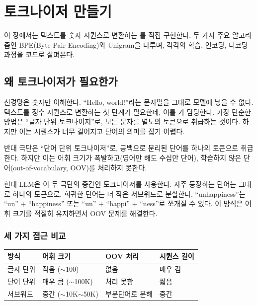 \chapter{토크나이저 만들기}
\label{ch:tokenizer}

이 장에서는 텍스트를 숫자 시퀀스로 변환하는 를 직접 구현한다. 두 가지 주요 알고리즘인 BPE(Byte Pair Encoding)와 Unigram을 다루며, 각각의 학습, 인코딩, 디코딩 과정을 코드로 살펴본다.

\section{왜 토크나이저가 필요한가}

신경망은 숫자만 이해한다. ``Hello, world!''라는 문자열을 그대로 모델에 넣을 수 없다. 텍스트를 정수 시퀀스로 변환하는 첫 단계가 필요한데, 이를 가 담당한다. 가장 단순한 방법은 ``글자 단위 토크나이저''로, 모든 문자를 별도의 토큰으로 취급하는 것이다. 하지만 이는 시퀀스가 너무 길어지고 단어의 의미를 잡기 어렵다.

반대 극단은 ``단어 단위 토크나이저''로, 공백으로 분리된 단어를 하나의 토큰으로 취급한다. 하지만 이는 어휘 크기가 폭발하고(영어만 해도 수십만 단어), 학습하지 않은 단어(out-of-vocabulary, OOV)를 처리하지 못한다.

현대 LLM은 이 두 극단의 중간인  토크나이저를 사용한다. 자주 등장하는 단어는 그대로 하나의 토큰으로, 희귀한 단어는 더 작은 서브워드로 분할한다. ``unhappiness''는 ``un'' + ``happiness'' 또는 ``un'' + ``happi'' + ``ness''로 쪼개질 수 있다. 이 방식은 어휘 크기를 적절히 유지하면서 OOV 문제를 해결한다.

\subsection{세 가지 접근 비교}

\begin{center}
\begin{tabularx}{\textwidth}{lXXX}
\toprule
\textbf{방식} & \textbf{어휘 크기} & \textbf{OOV 처리} & \textbf{시퀀스 길이} \\
\midrule
글자 단위 & 작음 ($\sim$100) & 없음 & 매우 김 \\
단어 단위 & 매우 큼 ($\sim$100K) & 처리 못함 & 짧음 \\
서브워드 & 중간 ($\sim$10K$\sim$50K) & 부분단어로 분해 & 중간 \\
\bottomrule
\end{tabularx}
\end{center}

